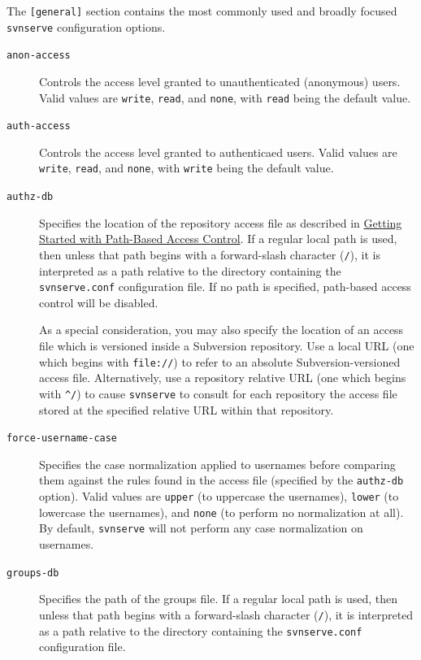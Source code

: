 The \texttt{{[}general{]}} section contains the most commonly used and
broadly focused \texttt{svnserve} configuration options.

\begin{description}
\item[\texttt{anon-access}]
Controls the access level granted to unauthenticated (anonymous) users.
Valid values are \texttt{write}, \texttt{read}, and \texttt{none}, with
\texttt{read} being the default value.
\item[\texttt{auth-access}]
Controls the access level granted to authenticaed users. Valid values
are \texttt{write}, \texttt{read}, and \texttt{none}, with
\texttt{write} being the default value.
\item[\texttt{authz-db}]
Specifies the location of the repository access file as described in
\hyperref[svn.serverconfig.pathbasedauthz.getting-started]{Getting
Started with Path-Based Access Control}. If a regular local path is
used, then unless that path begins with a forward-slash character
(\texttt{/}), it is interpreted as a path relative to the directory
containing the \texttt{svnserve.conf} configuration file. If no path is
specified, path-based access control will be disabled.

As a special consideration, you may also specify the location of an
access file which is versioned inside a Subversion repository. Use a
local URL (one which begins with \texttt{file://}) to refer to an
absolute Subversion-versioned access file. Alternatively, use a
repository relative URL (one which begins with \texttt{\^{}/}) to cause
\texttt{svnserve} to consult for each repository the access file stored
at the specified relative URL within that repository.
\item[\texttt{force-username-case}]
Specifies the case normalization applied to usernames before comparing
them against the rules found in the access file (specified by the
\texttt{authz-db} option). Valid values are \texttt{upper} (to uppercase
the usernames), \texttt{lower} (to lowercase the usernames), and
\texttt{none} (to perform no normalization at all). By default,
\texttt{svnserve} will not perform any case normalization on usernames.
\item[\texttt{groups-db}]
Specifies the path of the groups file. If a regular local path is used,
then unless that path begins with a forward-slash character
(\texttt{/}), it is interpreted as a path relative to the directory
containing the \texttt{svnserve.conf} configuration file.


\end{description}
